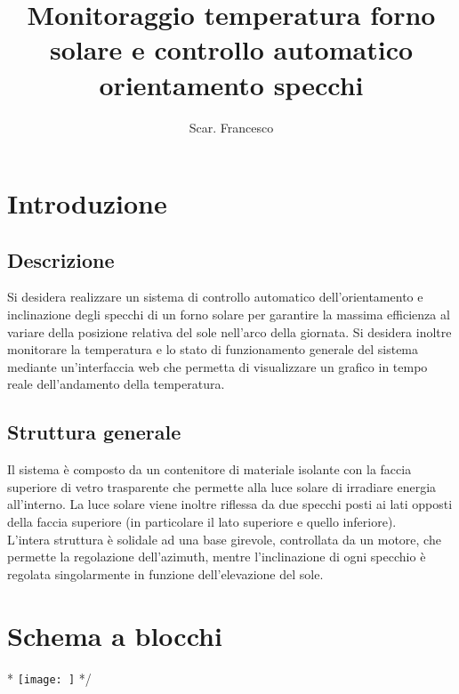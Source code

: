 \documentclass[12pt]{article}
\title{\textbf{Monitoraggio temperatura forno solare e controllo automatico orientamento specchi}}
\author{Scar. Francesco}
\date{}
\begin{document}
\maketitle

\tableofcontents{}

\newpage



\section{Introduzione}
    \subsection{Descrizione}
    Si desidera realizzare un sistema di controllo automatico dell'orientamento e inclinazione degli specchi di un forno solare per garantire la massima efficienza al variare della posizione relativa del sole nell'arco della giornata.
    Si desidera inoltre monitorare la temperatura e lo stato di funzionamento generale del sistema mediante un'interfaccia web che permetta di visualizzare un grafico in tempo reale dell'andamento della temperatura.


    \subsection{Struttura generale}
    Il sistema è composto da un contenitore di materiale isolante con la faccia superiore di vetro trasparente che permette alla luce solare di irradiare energia all'interno. La luce solare viene inoltre riflessa da due specchi posti ai lati opposti della faccia superiore (in particolare il lato superiore e quello inferiore).\\
    L'intera struttura è solidale ad una base girevole, controllata da un motore, che permette la regolazione dell'azimuth, mentre l'inclinazione di ogni specchio è regolata singolarmente in funzione dell'elevazione del sole.
    
\section{Schema a blocchi}

\/*
\noindent
\texttt{[image: ]}
*/


\vspace{0.5cm}
\noindent



\vfill
\end{document}

